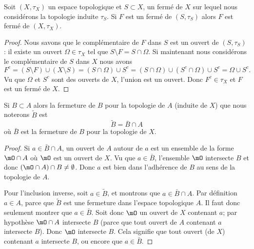\begin{lemma}        \label{LemBWSUooCCGvax}
    Soit \( (X,\tau_X)\) un espace topologique et \( S\subset X\), un fermé de \( X\) sur lequel nous considérons la topologie induite \( \tau_S\). Si \( F\) est un fermé de \( (S,\tau_S)\) alors \( F\) est fermé de \( (X,\tau_X)\).
\end{lemma}

\begin{proof}
    Nous savons que le complémentaire de \( F\) dans \( S\) est un ouvert de \( (S,\tau_S)\) : il existe un ouvert \( \Omega\in \tau_X\) tel que \( S\setminus F=S\cap \Omega\). Si maintenant nous considérons le complémentaire de \( S\) dans \( X\) nous avons
    \begin{equation}
        F^c=(S\setminus F)\cup (X\setminus S)=(S\cap \Omega)\cup S^c=(S\cap \Omega)\cup(S^c\cap \Omega)\cup S^c=\Omega\cup S^c.
    \end{equation}
    Vu que \( \Omega\) et \( S^c\) sont des ouverts de \( X\), l'union est un ouvert. Donc \( F^c\in \tau_X\) et \( F\) est un fermé de \( X\).
\end{proof}

\begin{lemma}       \label{LemkUYkQt}
    Si \( B\subset A\) alors la fermeture de \( B\) pour la topologie de \( A\) (induite de \( X\)) que nous noterons \( \tilde B\) est
    \begin{equation}
        \tilde B=\bar B\cap A
    \end{equation}
    où \( \bar B\) est la fermeture de \( B\) pour la topologie de \( X\).
\end{lemma}

\begin{proof}
    Si \( a\in \bar B\cap A\), un ouvert de \( A\) autour de \( a\) est un ensemble de la forme \( \mO\cap A\) où \( \mO\) est un ouvert de \( X\). Vu que \( a\in\bar B\), l'ensemble \( \mO\) intersecte \( B\) et donc \( (\mO\cap A)\cap B\neq \emptyset\). Donc \( a\) est bien dans l'adhérence de \( B\) au sens de la topologie de \( A\).

    Pour l'inclusion inverse, soit \( a\in \tilde  B\), et montrons que \( a\in \bar B\cap A\). Par définition \( a\in A\), parce que \( \tilde B\) est une fermeture dans l'espace topologique \( A\). Il faut donc seulement montrer que \( a\in\bar B\). Soit donc \( \mO\) un ouvert de \( X\) contenant \( a\); par hypothèse \( \mO\cap A\) intersecte \( B\) (parce que tout ouvert de \( A\) contenant \( a\) intersecte \( B\)). Donc \( \mO\) intersecte \( B\). Cela signifie que tout ouvert (de \( X\)) contenant \( a\) intersecte \( B\), ou encore que \( a\in \bar B\).
\end{proof}

